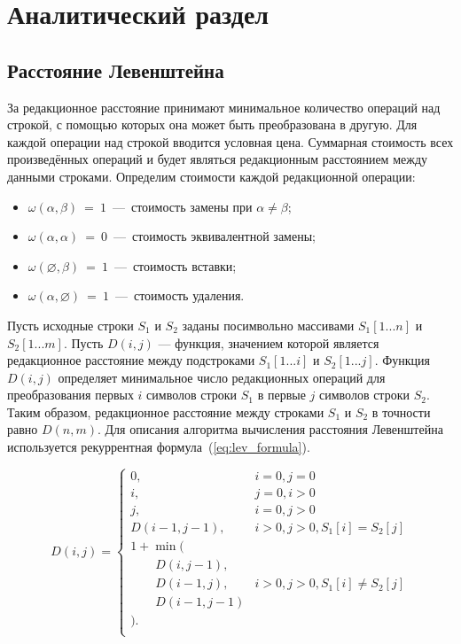 \chapter{Аналитический раздел}

\section{Расстояние Левенштейна}

За редакционное расстояние принимают минимальное количество операций над строкой, с помощью которых она может быть преобразована в другую. Для каждой операции над строкой вводится условная цена. Суммарная стоимость всех произведённых операций и будет являться редакционным расстоянием между данными строками. Определим стоимости каждой редакционной операции:

\begin{itemize}[label=--]
	\item $\omega(\alpha,\beta)~=~1$~---~стоимость замены при $\alpha \neq \beta$;
	\item $\omega(\alpha,\alpha)~=~0$~---~стоимость эквивалентной замены;
	\item $\omega(\varnothing,\beta)~=~1$~---~стоимость вставки;
	\item $\omega(\alpha,\varnothing)~=~1$~---~стоимость удаления.
\end{itemize}

Пусть исходные строки \(S_1\) и \(S_2\) заданы посимвольно массивами \(S_1[1...n]\) и \(S_2[1...m]\). Пусть \(D(i, j)\) --- функция, значением которой является редакционное расстояние между подстроками \(S_1[1...i]\) и \(S_2[1...j]\). Функция \(D(i, j)\) определяет минимальное число редакционных операций для преобразования первых \(i\) символов строки \(S_1\) в первые \(j\) символов строки \(S_2\). Таким образом, редакционное расстояние между строками \(S_1\) и \(S_2\) в точности равно  \(D(n, m)\). Для описания алгоритма вычисления расстояния Левенштейна используется рекуррентная формула~(\ref{eq:lev_formula}).

\begin{equation}
\label{eq:lev_formula}
    D(i, j) = \begin{cases}
        0, & i = 0, j = 0\\
        i, & j = 0, i > 0\\
        j, & i = 0, j > 0\\
        D(i-1, j-1), & i > 0, j > 0, S_1[i] = S_2[j]\\
        1 + \min (\\
            \qquad D(i, j-1),\\
            \qquad D(i-1, j), & i > 0, j > 0, S_1[i] \neq S_2[j]\\
            \qquad D(i-1, j-1)\\
            ).\\
    \end{cases}
\end{equation}

